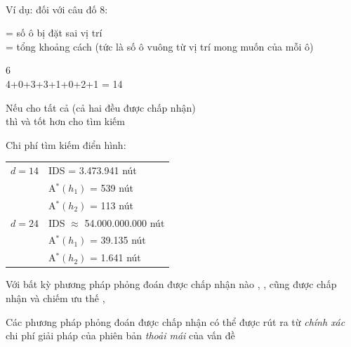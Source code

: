 \documentclass{article}
\begin{document}
\begin{huge}
\textwidth
{}

 \\



Ví dụ: đối với câu đố 8:

 = số ô bị đặt sai vị trí\\
 = tổng khoảng cách  \nl
(tức là số ô vuông từ vị trí mong muốn của mỗi ô)

\textwidth
{}

 6\\
 4+0+3+3+1+0+2+1 = {14}





Nếu  cho tất cả  (cả hai đều được chấp nhận)\\
thì    và tốt hơn cho tìm kiếm

Chi phí tìm kiếm điển hình:

\begin{tabular}{ll}
$d=14$ & IDS = 3.473.941 nút \\
       & A$^*(h_1)$ = 539 nút \\
       & A$^*(h_2)$ = 113 nút \\
$d=24$ & IDS $\approx$ 54.000.000.000 nút \\
       & A$^*(h_1)$ = 39.135 nút \\
       & A$^*(h_2)$ = 1.641 nút 
\end{tabular}

Với bất kỳ phương pháp phỏng đoán được chấp nhận nào , ,
\mat{\[
  h(n) = \max(h_a(n),h_b(n))
\]}
cũng được chấp nhận và chiếm ưu thế , 





Các phương pháp phỏng đoán được chấp nhận có thể được rút ra từ \emph{chính xác}\\
chi phí giải pháp của phiên bản \emph{thoải mái} của vấn đề


\end{huge}
\end{document}
